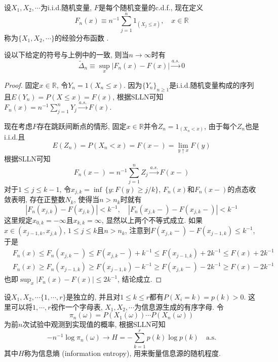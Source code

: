 \documentclass[cn, 12pt, math=mtpro2, bibstyle=apa, blue, twocol]{elegantbook}
\newcommand{\R}{\mathbb{R}}
\begin{document}
\begin{example}[经验分布函数]
设$X_1,X_2,\cdots$为i.i.d.随机变量, $F$是每个随机变量的c.d.f., 现在定义
$$F_n(x)\equiv n^{-1}\sum_{j=1}^{n}1_{(X_j\leq x)},\quad x\in\R$$
称为$\{X_1,X_2,\cdots\}$的经验分布函数 .
\end{example}
\begin{theorem}
  设以下给定的符号与上例中的一致, 则当$n\to\infty$时有
  $$    \tilde{\Delta}_n\equiv\sup_x|F_n(x)-F(x)|\xrightarrow{a.s.}0
$$
\end{theorem}
\begin{proof}
  固定$x\in\R$, 令$Y_n=1(X_n\leq x)$. 因为$\{Y_n\}_{n\ge1}$是i.i.d.随机变量构成的序列且$E(Y_n)=P(X\leq x)=F(x)$, 根据SLLN可知$F_n(x)=n^{-1}\sum_{j=1}^{n}Y_j\xrightarrow{a.s.}F(x)$.

  现在考虑$F$存在跳跃间断点的情形, 固定$x\in\R$并令$Z_n=1_{(X_n< x)}$, 由于每个$Z_n$也是i.i.d.且
  $$E(Z_n)=P(X_n<x)=F(x-)=\lim_{y\uparrow x}F(y)$$
  根据SLLN可知$$F_n(x-)=n^{-1}\sum_{j=1}^{n}Z_j\xrightarrow{a.s.}F(x-)$$
  对于$1\leq j\leq k-1$, 令$x_{j,k}=\inf\,\{y:F(y)\geq j/k\}$, $F_n(x)$和$F_n(x-)$的点态收敛表明, 存在正整数$N_k$, 使得当$n>n_k$时就有
  $$|F_n(x_{j,k})-F(x_{j,k})|<k^{-1}, \quad|F_n(x_{j,k}-)-F(x_{j,k}-)|<k^{-1}$$
  这里规定$x_{0,k}=-\infty$且$x_{k,k}=\infty$, 显然以上两个不等式成立. 如果$x\in(x_{j-1,k},x_{j,k})$, $1\leq j\leq k$且$n>n_k$, 注意到$F(x_{j,k}-)-F(x_{j-1,k})\leq k^{-1}$, 于是
  \begin{align*}
  &F_n(x)\leq F_n(x_{j,k}-)\leq F(x_{j,k}-)+k^{-1}\leq F(x_{j-1,k})+2k^{-1}\leq F(x)+2k^{-1} \\
  &F_n(x)\geq F_n(x_{j-1,k})\geq F(x_{j-1,k})-k^{-1}\geq F(x_{j,k}-)-2k^{-1}\geq F(x)-2k^{-1}
  \end{align*}
  也即$\sup_x|F_n(x)-F(x)|\leq 2k^{-1}$, 结论成立.
\end{proof}
\begin{example}[$\,$Shannon定理]
设$X_1,X_2,\cdots \{1,\cdots,r\}$是独立的, 并且对$1\leq k\leq r$都有$P(X_i=k)=p(k)>0$. 这里可以将$1,\cdots,r$视作一个字母表, $X_1,X_2,\cdots$为信息源生成的有序字母. 令
$$\pi_n(\omega)=P(X_1(\omega))\cdots P(X_n(\omega))$$
为前$n$次试验中观测到实现值的概率, 根据SLLN可知
$$-n^{-1}\log\pi_n(\omega)\to H=-\sum_{k=1}^{r}p(k)\log p(k)\quad \text{a.s.}$$
其中$H$称为信息熵 (information entropy), 用来衡量信息源的随机程度.
\end{example}
\end{document}
